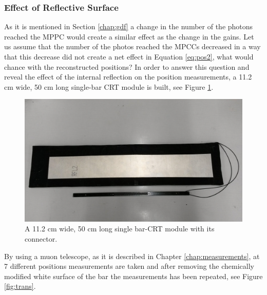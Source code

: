 \documentclass[a4paper]{article}\linespread{1.4}
\begin{document}
\subsubsection{Effect of Reflective Surface}
\label{chap:ref}
As it is mentioned in Section \ref{chap:gdf} a change in the number of the photons reached the MPPC would create a similar effect as the change in the gains. Let us assume that the number of the photos reached the MPCCs decreased in a way that this decrease did not create a net effect in Equation \ref{eq:pos2}, what would chance with the reconstructed positions?
In order to answer this question and reveal the effect of the internal reflection on the position measurements, a 11.2 cm wide, 50 cm long single-bar CRT module is built, see Figure \ref{fig:small}.
\begin{figure}[] \centering \includegraphics[width=120mm,scale=1.0]{small.jpg} \caption{A 11.2 cm wide, 50 cm long single bar-CRT module with its connector.} \label{fig:small} \end{figure}  
By using a muon telescope, as it is described in Chapter \ref{chap:measurements}, at 7 different positions measurements are taken and after removing the chemically modified white surface of the bar the measurements has been repeated, see Figure \ref{fig:trans}.
\end{document}
